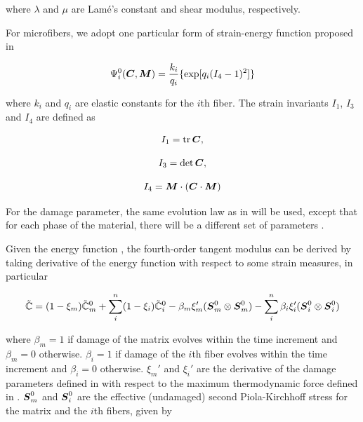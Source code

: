 \documentclass[12pt]{article}
\numberwithin{equation}{section}
\begin{document}
where $\lambda$ and $\mu$ are Lam\'{e}'s constant and shear modulus,
respectively.  

For microfibers, we adopt one particular form of strain-energy 
function proposed in \cite{Holzapfel.etal:2010}

\begin{equation}
  \Psi_i^0({\boldsymbol{C}}, {\boldsymbol{M}}) 
    = \frac{k_i}{q_i}
    \{ \exp[q_i(I_4 - 1)^2] \}
\end{equation}

where $k_i$ and $q_i$ are elastic constants for the $i$th fiber. 
The strain invariants $I_1$, $I_3$ and $I_4$ are defined as

\begin{equation}
  I_1 = \operatorname{\text{tr}} {\boldsymbol{C}}, 
\end{equation}

\begin{equation}
  I_3 = \det {\boldsymbol{C}},
\end{equation}

\begin{equation}
  I_4 = {\boldsymbol{M}} \cdot ({\boldsymbol{C}} \cdot {\boldsymbol{M}})
\end{equation}

For the damage parameter, the same evolution law as in 
 will be used, except that for each phase of the 
material, there will be a different set of parameters \cite{Chen.etal:2014}.

Given the energy function , the fourth-order
tangent modulus can be derived by taking derivative of the energy 
function with respect to some strain measures, in particular

\begin{equation}\label{eq:aniso_tangent}
  \tilde{\mathbb{C}} 
   = (1-\xi_m) \tilde{\mathbb{C}}_m^0 
   + \sum_i^n (1-\xi_i) \tilde{\mathbb{C}}_i^0
   -\beta_m \xi_m'  ({\boldsymbol{S}}_m^0 \otimes {\boldsymbol{S}}_m^0 )
   - \sum_i^n \beta_i \xi_i' ({\boldsymbol{S}}_i^0 \otimes {\boldsymbol{S}}_i^0 )
\end{equation}

where $\beta_m = 1$ if damage of the matrix evolves within the 
time increment and $\beta_m=0$ otherwise. $\beta_i = 1$ if damage of 
the $i$th fiber evolves within the time increment and $\beta_i=0$ 
otherwise. $\xi_m'$ and $\xi_i'$ are the derivative of the damage 
parameters defined in  with respect to the maximum 
thermodynamic force defined in . ${\boldsymbol{S}}_m^0$ and 
${\boldsymbol{S}}_i^0$ are the effective (undamaged) second Piola-Kirchhoff stress for the matrix and the $i$th fibers, given by
\end{document}
